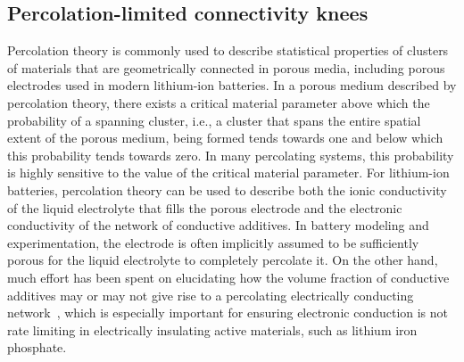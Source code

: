 \documentclass[journal=jpclcd,manuscript=article]{achemso}
\begin{document}
\subsection{Percolation-limited connectivity knees}

Percolation theory \cite{essam_percolation_1980, stauffer_introduction_1994} is commonly used to describe statistical properties of clusters of materials that are geometrically connected in porous media, including porous electrodes used in modern lithium-ion batteries\cite{ferguson_nonequilibrium_2012}. In a porous medium described by percolation theory, there exists a critical material parameter above which the probability of a spanning cluster, i.e., a cluster that spans the entire spatial extent of the porous medium, being formed tends towards one and below which this probability tends towards zero.\cite{ferguson_nonequilibrium_2012} In many percolating systems, this probability is highly sensitive to the value of the critical material parameter. For lithium-ion batteries, percolation theory can be used to describe both the ionic conductivity of the liquid electrolyte that fills the porous electrode and the electronic conductivity of the network of conductive additives. In battery modeling and experimentation, the electrode is often implicitly assumed to be sufficiently porous for the liquid electrolyte to completely percolate it. On the other hand, much effort has been spent on elucidating how the volume fraction of conductive additives may or may not give rise to a percolating electrically conducting network~\cite{chen_selection_2007, li_effects_2015, cerbelaud_understanding_2015, guzman_improved_2017}, which is especially important for ensuring electronic conduction is not rate limiting in electrically insulating active materials, such as lithium iron phosphate.\cite{li_effects_2015, guzman_improved_2017}

\end{document}
